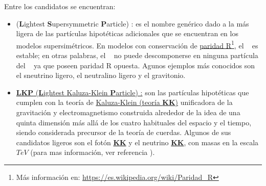 \begin{itemize}
Entre los candidatos se encuentran:
\begin{itemize}
\item 	\LSP (\textbf{L}ightest \textbf{S}upersymmetric \textbf{P}article)%
: es el nombre genérico dado a la más ligera de las partículas hipotéticas adicionales que se encuentran en los modelos supersimétricos. En modelos con conservación de \href{https://es.wikipedia.org/wiki/Paridad\_R}{paridad R}\footnote{{Más información en: \href{https://es.wikipedia.org/wiki/Paridad\_R}{https://es.wikipedia.org/wiki/Paridad\_R}}}, el \LSP ~ es estable; en otras palabras, el \LSP ~ no puede descomponerse en ninguna partícula del \ME~ ya que poseen paridad R opuesta. Agunos ejemplos más conocidos son el sneutrino ligero, el neutralino ligero y el gravitonio.


\item \href{https://en.wikipedia.org/wiki/Kaluza\%E2\%80\%93Klein_theory}{\textbf{LKP} (\textbf{L}ightest {K}aluza-Klein \textbf{P}article) :} son las partículas hipotéticas que cumplen con la teoría de \href{https://en.wikipedia.org/wiki/Kaluza\%E2\%80\%93Klein_theory}{Kaluza-Klein (teoría \textbf{KK})} unificadora de la gravitación y electromagnetismo construida alrededor de la idea de una quinta dimensión más allá de los cuatro habituales del espacio y el tiempo, siendo considerada precursor de la teoría de cuerdas. Algunos de sus candidatos ligeros son el fotón \href{https://en.wikipedia.org/wiki/Kaluza\%E2\%80\%93Klein_theory}{\textbf{KK}} y el neutrino \href{https://en.wikipedia.org/wiki/Kaluza\%E2\%80\%93Klein_theory}{\textbf{KK}}, con masas en la escala $TeV$ (para mas información, ver referencia \cite{servant_is_2003}).


\end{itemize}



\end{itemize}
